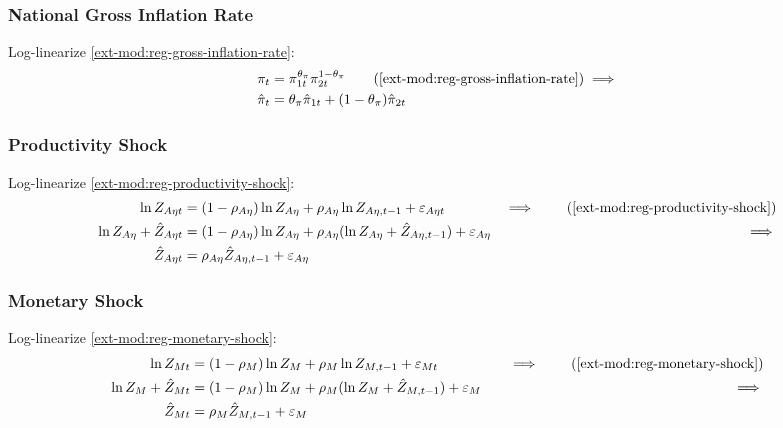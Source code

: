 \documentclass[../thesis.tex]{subfiles}
\begin{document}

\subsubsection*{National Gross Inflation Rate}

Log-linearize \ref{ext-mod:reg-gross-inflation-rate}:
\begin{align}
	\pi_{t} &= \pi_{1t}^{\theta_{\pi}} \pi_{2t}^{1 - \theta_{\pi}} \tag{\ref{ext-mod:reg-gross-inflation-rate}} \implies \nonumber \\
	\hat{\pi}_{t} &= \theta_{\pi} \hat{\pi}_{1t} + (1 - \theta_{\pi}) \hat{\pi}_{2t} \label{ext-mod:reg-gross-inflation-rate-ll}
\end{align}


\subsubsection*{Productivity Shock}

Log-linearize \ref{ext-mod:reg-productivity-shock}:
\begin{alignat}{2}
	\ln{Z_{A\eta t}} &= (1-\rho_{A\eta})\ln{Z_{A\eta}} + \rho_{A\eta}\ln{Z_{A\eta,t-1}} + \varepsilon_{A\eta t} &\implies \tag{\ref{ext-mod:reg-productivity-shock}} \\
	\ln{Z_{A\eta}} + \hat{Z}_{A\eta t} &= (1-\rho_{A\eta}) \ln{Z_{A\eta}} + \rho_{A\eta} (\ln{Z_{A\eta}} + \hat{Z}_{A\eta, t-1}) + \varepsilon_{A\eta} &\implies \nonumber \\
	\hat{Z}_{A\eta t} &= \rho_{A\eta} \hat{Z}_{A\eta, t-1} + \varepsilon_{A\eta} \label{ext-mod:reg-ll-productivity-shock}
\end{alignat}


\subsubsection*{Monetary Shock}

Log-linearize \ref{ext-mod:reg-monetary-shock}:
\begin{alignat}{2}
	\ln{Z_{Mt}} &= (1-\rho_M)\ln{Z_M} + \rho_M\ln{Z_{M,t-1}} + \varepsilon_{Mt} &\implies \tag{\ref{ext-mod:reg-monetary-shock}} \\
	\ln{Z_{M}} + \hat{Z}_{Mt} &= (1-\rho_M) \ln{Z_M} + \rho_M (\ln{Z_{M}} + \hat{Z}_{M,t-1}) + \varepsilon_{M} \quad &\implies \nonumber \\
	\hat{Z}_{Mt} &= \rho_M \hat{Z}_{M,t-1} + \varepsilon_{M} \label{ext-mod:reg-ll-monetary-shock}
\end{alignat}
\end{document}
